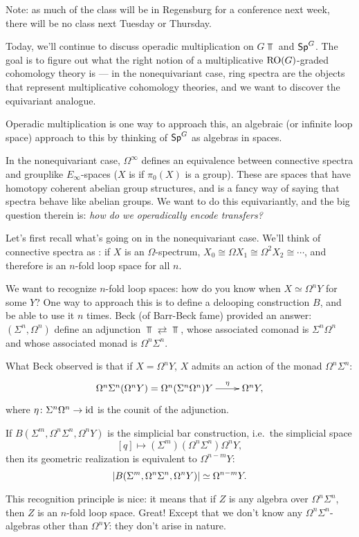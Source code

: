 Note: as much of the class will be in Regensburg for a conference next week, there will be no class next Tuesday or
Thursday.

Today, we'll continue to discuss operadic multiplication on $G\Top$ and $\mathsf{Sp}^G$. The goal is to figure out what
the right notion of a multiplicative $\mathrm{RO}(G)$-graded cohomology theory is --- in the nonequivariant case, ring
spectra are the objects that represent multiplicative cohomology theories, and we want to discover the equivariant
analogue.

Operadic multiplication is one way to approach this, an algebraic (or infinite loop space) approach to this by
thinking of $\mathsf{Sp}^G$ as algebras in spaces.

In the nonequivariant case, $\Omega^\infty$ defines an equivalence between connective spectra and grouplike
$E_\infty$-spaces ($X$ is  if $\pi_0(X)$ is a group). These are spaces that have homotopy coherent
abelian group structures, and is a fancy way of saying that spectra behave like abelian groups. We want to do this
equivariantly, and the big question therein is: \emph{how do we operadically encode transfers?}

Let's first recall what's going on in the nonequivariant case. We'll think of connective spectra as : if $X$ is an $\Omega$-spectrum, $X_0 \cong \Omega X_1 \cong \Omega^2 X_2 \cong \dotsb$, and therefore
is an $n$-fold loop space for all $n$.

We want to recognize $n$-fold loop spaces: how do you know when $X\simeq\Omega^n Y$ for some $Y$? One way to
approach this is to define a delooping construction $B$, and be able to use it $n$ times. Beck (of Barr-Beck fame)
provided an answer: $(\Sigma^n, \Omega^n)$ define an adjunction $\Top\rightleftarrows\Top$, whose associated
comonad is $\Sigma^n\Omega^n$ and whose associated monad is $\Omega^n\Sigma^n$.

What Beck observed is that if $X = \Omega^n Y$, $X$ admits an action of the monad $\Omega^n\Sigma^n$:
\[\xymatrix{
	\Omega^n\Sigma^n (\Omega^n Y) = \Omega^n (\Sigma^n\Omega^n) Y\ar[r]^-\eta &\Omega^n Y,
}\]
where $\eta\colon\Sigma^n\Omega^n\to\mathrm{id}$ is the counit of the adjunction.
\begin{thm}[Beck]
If $B(\Sigma^m, \Omega^n\Sigma^n, \Omega^n Y)$ is the simplicial bar construction, i.e.\ the simplicial space
\[[q]\mapsto (\Sigma^m)(\Omega^n\Sigma^n)\Omega^n Y,\]
then its geometric realization is equivalent to $\Omega^{n-m}Y$:
\[\lvert B(\Sigma^m, \Omega^n\Sigma^n, \Omega^n Y)\rvert\simeq \Omega^{n-m}Y.\]
\end{thm}
This recognition principle is nice: it means that if $Z$ is any algebra over $\Omega^n\Sigma^n$, then $Z$ is an
$n$-fold loop space. Great! Except that we don't know any $\Omega^n\Sigma^n$-algebras other than $\Omega^n Y$: they
don't arise in nature.

